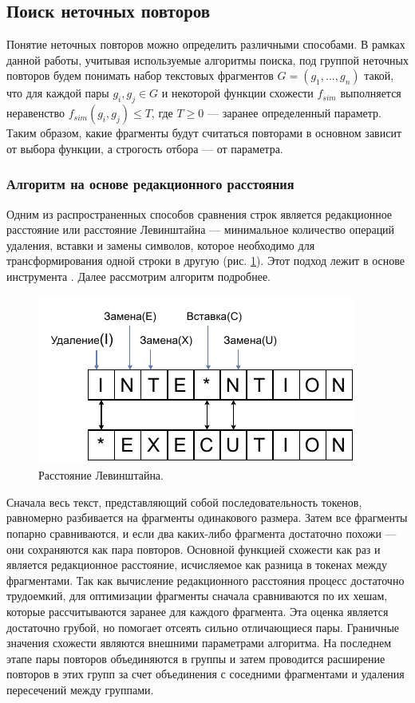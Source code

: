\documentclass[14pt]{matmex-diploma-custom}
\begin{document}
\subsection{Поиск неточных повторов}

Понятие неточных повторов можно определить различными способами. В рамках данной работы, учитывая используемые алгоритмы поиска, под группой неточных повторов будем понимать набор текстовых фрагментов $G = (g_1,...,g_n)$ такой, что для каждой пары $g_i, g_j \in G$ и некоторой функции схожести $f_{sim}$ выполняется неравенство $f_{sim}(g_i, g_j) \le T$, где $T\ge0$ --- заранее определенный параметр. Таким образом, какие фрагменты будут считаться повторами в основном зависит от выбора функции, а строгость отбора --- от параметра.

\subsubsection{Алгоритм на основе редакционного расстояния}

Одним из распространенных способов сравнения строк является редакционное расстояние или расстояние Левинштайна --- минимальное количество операций удаления, вставки и замены символов, которое необходимо для трансформирования одной строки в другую (рис. \ref{fig:Edit-dist}). Этот подход лежит в основе инструмента \cite{bib:tool:FuzzySearch}. Далее рассмотрим алгоритм подробнее.

\begin{figure}[h!]
	\includegraphics[scale=1.45]{pictures/Edit-dist.pdf}
	\centering
	\caption{Расстояние Левинштайна.}
	\label{fig:Edit-dist}
\end{figure}

Сначала весь текст, представляющий собой последовательность токенов, равномерно разбивается на фрагменты одинакового размера. Затем все фрагменты попарно сравниваются, и если два каких-либо фрагмента достаточно похожи --- они сохраняются как пара повторов. Основной функцией схожести как раз и является редакционное расстояние, исчисляемое как разница в токенах между фрагментами. Так как вычисление редакционного расстояния процесс достаточно трудоемкий, для оптимизации фрагменты сначала сравниваются по их хешам, которые рассчитываются заранее для каждого фрагмента.  Эта оценка является достаточно грубой, но помогает отсеять сильно отличающиеся пары. Граничные значения схожести являются внешними параметрами алгоритма. На последнем этапе пары повторов объединяются в группы и затем проводится расширение повторов в этих групп за счет объединения с соседними фрагментами и удаления пересечений между группами.
\end{document}
